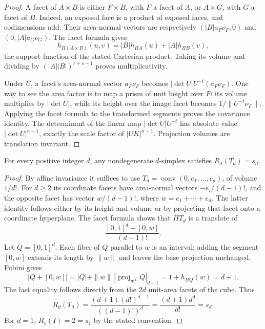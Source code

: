 \begin{proof}
A facet of $A\times B$ is either $F\times B$, with $F$ a facet of
$A$, or $A\times G$, with $G$ a facet of $B$. Indeed, an exposed face
is a product of exposed faces, and codimensions add. Their area-normal
vectors are respectively $(|B|a_F\nu_F,0)$ and
$(0,|A|a_G\nu_G)$. The facet formula gives
\[
 h_{\Pi(A\times B)}(u,v)
       =|B|h_{\Pi A}(u)+|A|h_{\Pi B}(v),
\]
the support function of the stated Cartesian product. Taking its
volume and dividing by $(|A||B|)^{r+s-1}$ proves multiplicativity.

Under $U$, a facet's area-normal vector $a_F\nu_F$ becomes
$|\det U|U^{-t}(a_F\nu_F)$. One way to see the area factor is to map
a prism of unit height over $F$: its volume multiplies by
$|\det U|$, while its height over the image facet becomes
$1/\|U^{-t}\nu_F\|$. Applying the facet formula to the transformed
segments proves the covariance identity. The determinant of the
linear map $|\det U|U^{-t}$ has absolute value
$|\det U|^{n-1}$, exactly the scale factor of $|UK|^{n-1}$.
Projection volumes are translation invariant.
\end{proof}

\begin{proposition}\label{prop:proj-simplex}
For every positive integer $d$, any nondegenerate $d$-simplex satisfies
$R_d(T_d)=s_d$.
\end{proposition}

\begin{proof}
By affine invariance it suffices to use
$T_d=\operatorname{conv}(0,e_1,\ldots,e_d)$, of volume $1/d!$.
For $d\ge2$ its coordinate facets have area-normal vectors
$-e_i/(d-1)!$, and the opposite facet has vector
$w/(d-1)!$, where $w=e_1+\cdots+e_d$. The latter identity follows
either by its height and volume or by projecting that facet onto a
coordinate hyperplane. The facet formula shows that $\Pi T_d$ is a
translate of
\[
 \frac{[0,1]^d+[0,w]}{(d-1)!}.
\]
Let $Q=[0,1]^d$. Each fiber of $Q$ parallel to $w$ is an interval;
adding the segment $[0,w]$ extends its length by $\|w\|$ and leaves
the base projection unchanged. Fubini gives
\[
 |Q+[0,w]|=|Q|+\|w\|\,|\operatorname{proj}_{w^\perp}Q|_{d-1}
         =1+h_{\Pi Q}(w)=d+1.
\]
The last equality follows directly from the $2d$ unit-area facets of
the cube. Thus
\[
 R_d(T_d)=\frac{(d+1)(d!)^{d-1}}{((d-1)!)^d}
          =\frac{(d+1)d^d}{d!}=s_d.
\]
For $d=1$, $R_1(I)=2=s_1$ by the stated convention.
\end{proof}

